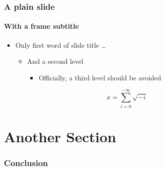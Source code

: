 \documentclass[inverse,aspectratio=169,classification=public-cc-by]{lh-presentation}
\begin{document}
\frame{\sectionpage}

\begin{frame}[plain,classification=confidential]
  \frametitle{A plain slide}
  \framesubtitle{With a frame subtitle}


  \begin{itemize}
  \item Only first word of slide title \ldots
    \begin{itemize}
    \item  And a second level 
      \begin{itemize}
      \item  Officially, a third level should be avoided
      \end{itemize}
    \end{itemize}
  \end{itemize}
  \[ x = \sum_{i=0}^{-\infty}\sqrt{-i}\]
\end{frame}

\ThanksFrame
\KeyTakeAwayFrame{
\begin{itemize}
\item \ldots
\item \ldots
\item \ldots
\item \ldots
\end{itemize}
}
\CopyrightFrame
{}

\section{Another Section}
\frame{\sectionpage}
\begin{frame}
\frametitle{Conclusion}
\end{frame}
\end{document}
